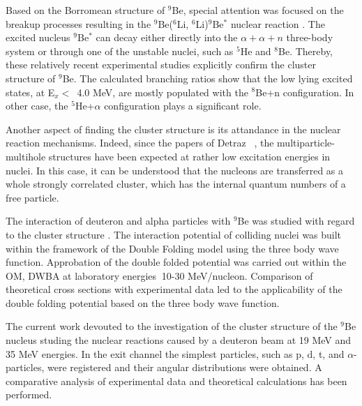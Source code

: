 \documentclass[10pt]{iopart}
\begin{document}
Based on the Borromean structure of $^9$Be, special attention was focused on the breakup processes resulting in the $^9$Be($^6$Li, $^6$Li)$^9$Be$^*$ nuclear reaction \cite{brown2007, papka2007}. The excited nucleus $^9$Be$^*$ can decay either directly into the $\alpha+\alpha+n$ three-body system or through one of the unstable nuclei, such as $^5$He and $^8$Be. Thereby, these relatively recent experimental studies explicitly confirm the cluster structure of $^9$Be. 
The calculated branching ratios  show that the low lying excited states, at E$_x <$~4.0 MeV,  are mostly populated with the $^8$Be+n configuration. In other case, the $^5$He+$\alpha$ configuration plays a significant  role.

Another aspect of finding the cluster structure is its attandance in the nuclear reaction mechanisms. Indeed, since the papers of Detraz \etal~\cite{detraz1970, detraz1974}, the multiparticle-multihole structures have been expected at rather low excitation energies in nuclei. In this case, it can be understood that the nucleons are transferred as a whole strongly correlated cluster, which has the internal quantum numbers of a free particle.

The interaction of deuteron and alpha particles with $^9$Be was studied with regard to the cluster structure \cite{urazbekov2016, urazbekov2017}. The interaction potential of colliding nuclei was built within the framework of the Double Folding model using the three body wave function. Approbation of the double folded potential was carried out within the OM, DWBA at laboratory energies $~$10-30 MeV/nucleon. Comparison of theoretical cross sections with experimental data led to the applicability of the double folding potential based on the three body wave function.

The current work devouted to the investigation of the cluster structure of the $^9$Be nucleus studing the nuclear reactions caused by a deuteron beam at 19 MeV and 35 MeV energies. In the exit channel the simplest particles, such as p, d, t, and $\alpha$-particles, were registered and their angular distributions were obtained. 
A comparative analysis of experimental data and theoretical calculations has been performed.
	
\end{document}
